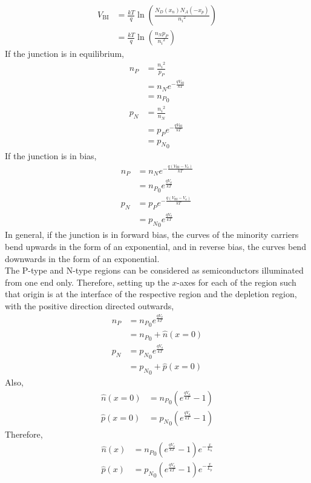 \documentclass[titlepage, fleqn, a4paper, 12pt, twoside]{article}
\theoremstyle{definition}
\theoremstyle{theorem}
\begin{document}
\begin{align*}
	V_{\text{BI}} &= \frac{k T}{q} \ln\left( \frac{N_D(x_n) N_A(-x_p)}{{n_i}^2} \right)\\
	&= \frac{k T}{q} \ln\left( \frac{n_N p_P}{{n_i}^2} \right)
\end{align*}
If the junction is in equilibrium,
\begin{align*}
	n_P &= \frac{{n_i}^2}{p_P}\\
	&= n_N e^{-\frac{q V_{\text{BI}}}{k T}}\\
	&= {n_P}_0\\
	p_N &= \frac{{n_i}^2}{n_N}\\
	&= p_P e^{-\frac{q V_{\text{BI}}}{k T}}\\
	&= {p_N}_0
\end{align*}
If the junction is in bias,
\begin{align*}
	n_P &= n_N e^{-\frac{q (V_{\text{BI}} - V_a)}{k T}}\\
	&= {n_P}_0 e^{\frac{q V_a}{k T}}\\
	p_N &= p_P e^{-\frac{q (V_{\text{BI}} - V_a)}{k T}}\\
	&= {p_N}_0 e^{\frac{q V_a}{k T}}
\end{align*}
In general, if the junction is in forward bias, the curves of the minority carriers bend upwards in the form of an exponential, and in reverse bias, the curves bend downwards in the form of an exponential.\\
The P-type and N-type regions can be considered as semiconductors illuminated from one end only.
Therefore, setting up the $x$-axes for each of the region such that origin is at the interface of the respective region and the depletion region, with the positive direction directed outwards,
\begin{align*}
	n_P &= {n_P}_0 e^{\frac{q V_a}{k T}}\\
	&= {n_P}_0 + \hat{n}(x = 0)\\
	p_N &= {p_N}_0 e^{\frac{q V_a}{k T}}\\
	&= {p_N}_0 + \hat{p}(x = 0)
\end{align*}
Also,
\begin{align*}
	\hat{n}(x = 0) &= {n_P}_0 \left( e^{\frac{q V_a}{k T}} - 1 \right)\\
	\hat{p}(x = 0) &= {p_N}_0 \left( e^{\frac{q V_a}{k T}} - 1 \right)
\end{align*}
Therefore,
\begin{align*}
	\hat{n}(x) &= {n_P}_0 \left( e^{\frac{q V_a}{k T}} - 1 \right) e^{-\frac{x}{L_n}}\\
	\hat{p}(x) &= {p_N}_0 \left( e^{\frac{q V_a}{k T}} - 1 \right) e^{-\frac{x}{L_p}}
\end{align*}
\end{document}
